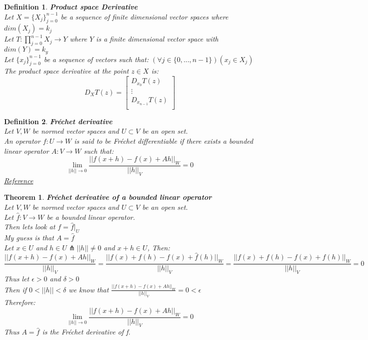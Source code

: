 \documentclass[12pt]{extarticle}
\theoremstyle{plain}
\newtheorem{thm}{Theorem}[section]
\theoremstyle{plain}
\theoremstyle{Definition}
\newtheorem{def.}{Definition}[section]
\theoremstyle{Definition}
\theoremstyle{plain}
\begin{document}
\newpage
\begin{def.} \textbf{Product space Derivative} \\ 
		Let $X = \{X_j\}_{j=0}^{n-1}$ be a sequence of finite dimensional vector spaces where $dim(X_j) = k_j$ \\ 
		Let $T : \prod_{j=0}^{n-1} X_j \to Y$ where $Y$ is a finite dimensional vector space with $dim(Y) = k_y$ \\
		Let $\{x_j\}_{j=0}^{n-1}$ be a sequence of vectors such that: $(\forall j \in \{0,...,n-1\})(x_j \in X_j)$ \\ 
		The product space derivative at the point $z \in X$ is: \\ 
		\[
		D_{X} T(z) = 
		\begin{bmatrix}
		D_{x_0} T(z) \\ 
		\vdots \\ 
		D_{x_{n-1}} T(z) \\ 		
		\end{bmatrix}
		\]
\end{def.}


\newpage
\begin{def.} \textbf{Fréchet derivative} \\ 
		Let $V,W$ be normed vector spaces and $U \subset V$ be an open set. \\ 
		An operator $f : U \to W$ is said to be Fréchet differentiable if there exists a bounded linear operator $A : V \to W$ such that: \\ 
		$$\lim_{||h||\to0} \frac{||f(x+h) - f(x) + Ah||_W}{||h||_V} = 0$$
		\href{https://en.wikipedia.org/wiki/Fr%C3%A9chet_derivative}{Reference}
\end{def.} 
\begin{thm} \textbf{Fréchet derivative of a bounded linear operator} \\ 
	Let $V,W$ be normed vector spaces and $U \subset V$ be an open set. \\ 
	Let $\hat{f} : V \to W$ be a bounded linear operator. \\
	Then lets look at $f = \hat{f}|_{U}$ \\ 
	My guess is that $A = \hat{f}$ \\ 
	Let $x \in U$ and $h \in U \pitchfork ||h|| \not = 0$ and $x+h \in U$, Then: \\ 
	$$\frac{||f(x+h) - f(x) + Ah||_W}{||h||_V} = \frac{||f(x)+f(h) - f(x) + \hat{f}(h)||_W}{||h||_V} = \frac{||f(x)+f(h) - f(x) + f(h)||_W}{||h||_V}= 0$$
	Thus let $\epsilon > 0$ and $\delta > 0$ \\ 
	Then if $0 < ||h|| < \delta$ we know that  
	$\frac{||f(x+h) - f(x) + Ah||_W}{||h||_V} = 0 < \epsilon$ \\ 
	Therefore: 
	$$\lim_{||h||\to0} \frac{||f(x+h) - f(x) + Ah||_W}{||h||_V} = 0$$
	Thus $A = \hat{f}$ is the Fréchet derivative  of f. 
\end{thm}
\end{document}

